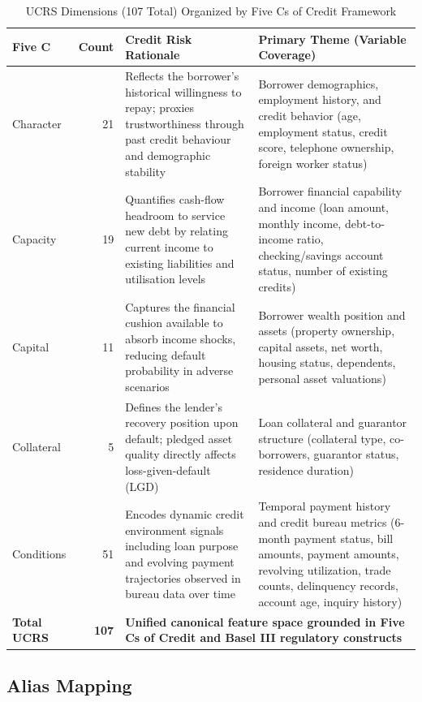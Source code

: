 \documentclass[onecolumn]{IEEEtai}
\begin{document}
\begin{table}[!htbp]
\centering
\small
\caption{UCRS Dimensions (107 Total) Organized by Five Cs of Credit Framework}
\label{tab:ucrs_breakdown}
\setlength{\tabcolsep}{4pt}
\begin{tabularx}{\textwidth}{l r X X}
\toprule
\textbf{Five C} & \textbf{Count} & \textbf{Credit Risk Rationale} & \textbf{Primary Theme (Variable Coverage)} \\
\midrule
Character  & 21 &
Reflects the borrower's historical willingness to repay; proxies trustworthiness through past credit behaviour and demographic stability &
Borrower demographics, employment history, and credit behavior (age, employment status, credit score, telephone ownership, foreign worker status) \\
\midrule
Capacity   & 19 &
Quantifies cash-flow headroom to service new debt by relating current income to existing liabilities and utilisation levels &
Borrower financial capability and income (loan amount, monthly income, debt-to-income ratio, checking/savings account status, number of existing credits) \\
\midrule
Capital    & 11 &
Captures the financial cushion available to absorb income shocks, reducing default probability in adverse scenarios &
Borrower wealth position and assets (property ownership, capital assets, net worth, housing status, dependents, personal asset valuations) \\
\midrule
Collateral &  5 &
Defines the lender's recovery position upon default; pledged asset quality directly affects loss-given-default (LGD) &
Loan collateral and guarantor structure (collateral type, co-borrowers, guarantor status, residence duration) \\
\midrule
Conditions & 51 &
Encodes dynamic credit environment signals including loan purpose and evolving payment trajectories observed in bureau data over time &
Temporal payment history and credit bureau metrics (6-month payment status, bill amounts, payment amounts, revolving utilization, trade counts, delinquency records, account age, inquiry history) \\
\midrule
\textbf{Total UCRS} & \textbf{107} & \multicolumn{2}{l}{\textbf{Unified canonical feature space grounded in Five Cs of Credit and Basel III regulatory constructs}} \\
\bottomrule
\end{tabularx}
\end{table}

\subsection{Alias Mapping}\vspace{-2pt}
\end{document}
